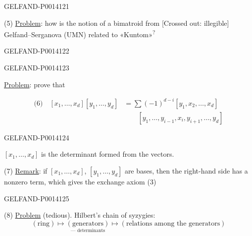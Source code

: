 \begin{GelfandAdjacentEvidence}{GELFAND-P001412}{1}

(5) \uline{Problem}: how is the notion of a bimatroid from
[Crossed out: illegible] Gelfand–Serganova (UMN)
related to «Kuntom»\textsuperscript{?}
\end{GelfandAdjacentEvidence}
\begin{GelfandAdjacentEvidence}{GELFAND-P001412}{2}

\end{GelfandAdjacentEvidence}
\begin{GelfandAdjacentEvidence}{GELFAND-P001412}{3}


\uline{Problem}: prove that

\[
\begin{aligned}
\text{(6)}\quad [x_1,\ldots,x_d][y_1,\ldots,y_d]
 &= \sum(-1)^{d-i}[y_1,x_2,\ldots,x_d]\\
 &\qquad [y_1,\ldots,y_{i-1},x_i,y_{i+1},\ldots,y_d]
\end{aligned}
\]
\end{GelfandAdjacentEvidence}
\begin{GelfandAdjacentEvidence}{GELFAND-P001412}{4}


\([x_1,\ldots,x_d]\) is the determinant formed from the vectors.

(7) \uline{Remark}: if \([x_1,\ldots,x_d]\), \([y_1,\ldots,y_d]\)
are bases, then the right-hand side has a nonzero term, which gives the exchange axiom (3)
\end{GelfandAdjacentEvidence}
\begin{GelfandAdjacentEvidence}{GELFAND-P001412}{5}


(8) \uline{Problem} (tedious). Hilbert’s chain of syzygies:
\[
(\text{ring})\longmapsto
\underset{\text{— determinants}}{(\text{generators})}
\longmapsto (\text{relations among the generators})
\]
\end{GelfandAdjacentEvidence}
